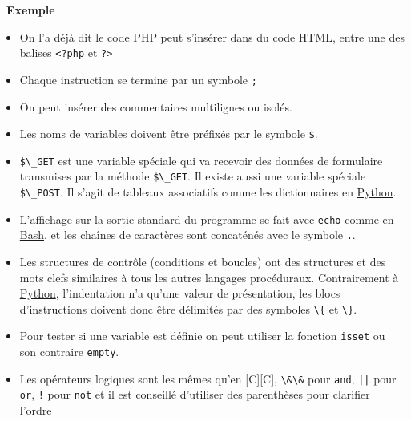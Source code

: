 \documentclass[
  11pt,
]{article}
\newcommand{\passthrough}[1]{#1}
\providecommand{\tightlist}{%
  \setlength{\itemsep}{0pt}\setlength{\parskip}{0pt}}
\newcounter{exple}
\newenvironment{exemple}[1]
{\par \medskip   \addtocounter{exple}{1} \noindent  
\begin{bclogo}[arrondi =0.1,   noborder = true, logo=\bclampe, marge=4]{~\textbf{Exemple} \textbf{\theexple} {\itshape #1} }  \par}
{
\end{bclogo}
 \par \bigskip }
\newcounter{prog}
\newcounter{logi}
\begin{document}
\begin{exemple}{}
\begin{enumerate}
  \begin{itemize}
  \tightlist
  \item
    On l'a déjà dit le code
    \href{https://developer.mozilla.org/fr/docs/Glossaire/PHP}{PHP} peut
    s'insérer dans du code
    \href{https://developer.mozilla.org/fr/docs/Glossaire/HTML}{HTML},
    entre une des balises \passthrough{\lstinline!<?php!} et
    \passthrough{\lstinline!?>!}
  \item
    Chaque instruction se termine par un symbole
    \passthrough{\lstinline!;!}
  \item
    On peut insérer des commentaires multilignes ou isolés.
  \item
    Les noms de variables doivent être préfixés par le symbole
    \passthrough{\lstinline!$!}.
  \item
    \passthrough{\lstinline!$\_GET!} est une variable spéciale qui va
    recevoir des données de formulaire transmises par la méthode
    \passthrough{\lstinline!$\_GET!}. Il existe aussi une variable
    spéciale \passthrough{\lstinline!$\_POST!}. Il s'agit de tableaux
    associatifs comme les dictionnaires en
    \href{https://docs.python.org/3.7/library/cgi.html}{Python}.
  \item
    L'affichage sur la sortie standard du programme se fait avec
    \passthrough{\lstinline!echo!} comme en
    \href{https://doc.ubuntu-fr.org/bash}{Bash}, et les chaînes de
    caractères sont concaténés avec le symbole
    \passthrough{\lstinline!.!}.
  \item
    Les structures de contrôle (conditions et boucles) ont des
    structures et des mots clefs similaires à tous les autres langages
    procéduraux. Contrairement à
    \href{https://docs.python.org/3.7/library/cgi.html}{Python},
    l'indentation n'a qu'une valeur de présentation, les blocs
    d'instructions doivent donc être délimités par des symboles
    \passthrough{\lstinline!\{!} et \passthrough{\lstinline!\}!}.
  \item
    Pour tester si une variable est définie on peut utiliser la fonction
    \passthrough{\lstinline!isset!} ou son contraire
    \passthrough{\lstinline!empty!}.
  \item
    Les opérateurs logiques sont les mêmes qu'en {[}C{]}{[}C{]},
    \passthrough{\lstinline!\&\&!} pour \passthrough{\lstinline!and!},
    \passthrough{\lstinline!||!} pour \passthrough{\lstinline!or!},
    \passthrough{\lstinline"!"} pour \passthrough{\lstinline!not!} et il
    est conseillé d'utiliser des parenthèses pour clarifier l'ordre

\end{itemize}
\end{enumerate}
\end{exemple}
\end{document}

